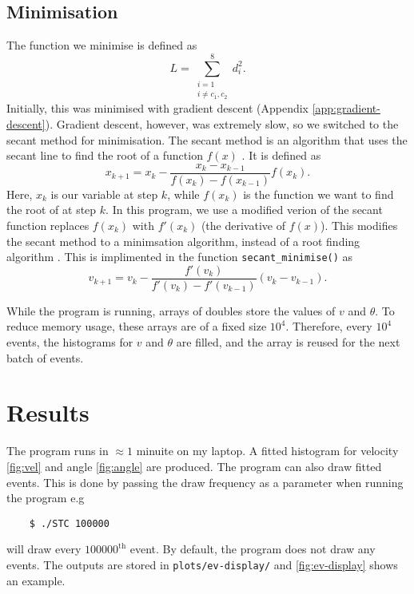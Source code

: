 \documentclass[11pt]{article}
\begin{document}
\subsection{Minimisation}
\label{sec:minimisation}
The function we minimise is defined as
\begin{equation}
    L = \sum\limits_{\substack{i=1 \\ i\neq c_1, c_2}}^{8} d_i^2.
    \label{eq:loss}
\end{equation}
Initially, this was minimised with gradient descent (Appendix \ref{app:gradient-descent}). Gradient descent, however, was extremely slow, so we switched to the secant method for minimisation. The secant method is an algorithm that uses the secant line to find the root of a function $f(x)$ \cite{secant-history}. It is defined as 
\begin{equation}
    x_{k+1} = x_k - \frac{x_k - x_{k-1}}{f(x_k)-f(x_{k-1})} f(x_k).
    \label{eq:secant}
\end{equation}
Here, $x_k$ is our variable at step $k$, while $f(x_k)$ is the function we want to find the root of at step $k$. In this program, we use a modified verion of the secant function replaces $f(x_k)$ with $f'(x_k)$ (the derivative of $f(x)$). This modifies the secant method to a minimsation algorithm, instead of a root finding algorithm \cite{secant-minimsation}. This is implimented in the function \texttt{secant\_minimise()} as
\begin{equation}
    v_{k+1} = v_k - \frac{f'(v_k)}{f'(v_k) - f'(v_{k-1})}(v_k - v_{k-1}).
\end{equation}

While the program is running, arrays of doubles store the values of $v$ and $\theta$. To reduce memory usage, these arrays are of a fixed size $10^4$. Therefore, every $10^4$ events, the histograms for $v$ and $\theta$ are filled, and the array is reused for the next batch of events.

\section{Results}
\label{sec:results}
The program runs in $\approx 1$ minuite on my laptop. A fitted histogram for velocity \autoref{fig:vel} and angle \autoref{fig:angle} are produced. The program can also draw fitted events. This is done by passing the draw frequency as a parameter when running the program e.g
\begin{verbatim}
    $ ./STC 100000
\end{verbatim}
will draw every $100000^\text{th}$ event. By default, the program does not draw any events. The outputs are stored in \texttt{plots/ev-display/} and \autoref{fig:ev-display} shows an example.
\end{document}
